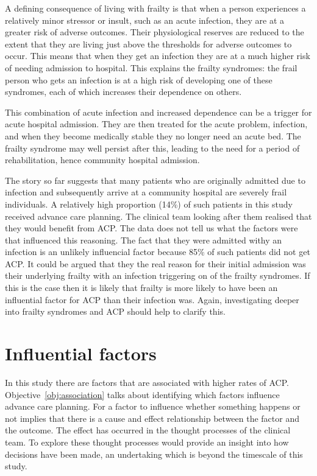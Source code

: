 \documentclass
[
	12pt,
	a4paper,
	oneside,
]{report}
\begin{document}
A defining consequence of living with frailty is that when a person 
experiences a relatively minor stressor or insult, such as an acute infection, 
they are at a greater risk of adverse outcomes. Their physiological reserves
are reduced to the extent that they are living just above the thresholds 
for adverse outcomes to occur. This means that when they get an infection
they are at a much higher risk of needing admission to hospital. This explains
the frailty syndromes: the frail person who gets an infection is at a high 
risk of developing one of these syndromes, each of which increases their 
dependence on others.

This combination of acute infection and increased dependence can be a trigger
for acute hospital admission. They are then treated for the acute problem,
infection, and when they become medically stable they no longer need an acute
bed. The frailty syndrome may well persist after this, leading to the
need for a period of rehabilitation, hence community hospital admission.

The story so far suggests that many patients who are originally admitted 
due to infection and 
subsequently arrive at a community hospital are severely frail individuals.
A relatively high proportion (14\%) of such patients in this study received
advance care planning. The clinical team looking after them realised that they
would benefit from ACP. The data does not tell us what the factors were that 
influenced this reasoning. The fact that they were admitted withy an infection
is an unlikely influencial factor because 85\% of such patients did not get
ACP. It could be argued that they the real reason for their initial admission
was their underlying frailty with an infection triggering on of the frailty 
syndromes. If this is the case then it is likely that frailty is more likely 
to have been an influential factor for ACP than their infection was. Again, 
investigating deeper into frailty syndromes and ACP should help to clarify 
this.

\section{Influential factors}

In this study there are factors that are associated with higher rates of ACP.
Objective~\ref{obj:association} talks about identifying which factors 
influence advance care planning.
For a factor to influence whether something happens or not implies that there 
is a cause and effect relationship between the factor and the outcome. 
The effect has occurred in the thought processes of the clinical team. To 
explore these thought processes would provide an insight into how decisions
have been made, an undertaking which is beyond the timescale of this study.
\end{document}
